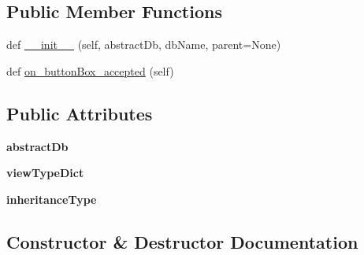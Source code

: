 \subsection*{Public Member Functions}
\begin{DoxyCompactItemize}
\item 
def \mbox{\hyperlink{class_dsg_tools_1_1_server_tools_1_1create_view_1_1_create_view_a62511984c864bd4f80d2a0f3311e223b}{\+\_\+\+\_\+init\+\_\+\+\_\+}} (self, abstract\+Db, db\+Name, parent=None)
\item 
def \mbox{\hyperlink{class_dsg_tools_1_1_server_tools_1_1create_view_1_1_create_view_ad3e078ea1620699d079930bacbfba94d}{on\+\_\+button\+Box\+\_\+accepted}} (self)
\end{DoxyCompactItemize}
\subsection*{Public Attributes}
\begin{DoxyCompactItemize}
\item 
\mbox{\label{class_dsg_tools_1_1_server_tools_1_1create_view_1_1_create_view_a2f7e9cdb36c1a9cc8acbd6e0665b1645}} 
{\bfseries abstract\+Db}
\item 
\mbox{\label{class_dsg_tools_1_1_server_tools_1_1create_view_1_1_create_view_a041cf6069b5e79b8c0323ff552dabe30}} 
{\bfseries view\+Type\+Dict}
\item 
\mbox{\label{class_dsg_tools_1_1_server_tools_1_1create_view_1_1_create_view_a680ed6bc8a6cb844969fc023df48b923}} 
{\bfseries inheritance\+Type}
\end{DoxyCompactItemize}


\subsection{Constructor \& Destructor Documentation}
\mbox{\label{class_dsg_tools_1_1_server_tools_1_1create_view_1_1_create_view_a62511984c864bd4f80d2a0f3311e223b}} 
